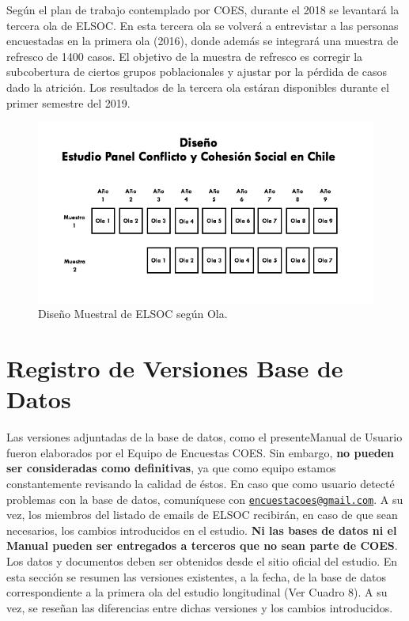 \documentclass[
]{book}
\begin{document}
Según el plan de trabajo contemplado por COES, durante el 2018 se levantará la tercera ola de ELSOC. En esta tercera ola se volverá a entrevistar a las personas encuestadas en la primera ola (2016), donde además se integrará una muestra de refresco de 1400 casos. El objetivo de la muestra de refresco es corregir la subcobertura de ciertos grupos poblacionales y ajustar por la pérdida de casos dado la atrición. Los resultados de la tercera ola estáran disponibles durante el primer semestre del 2019.

\begin{figure}

{\centering \includegraphics[width=0.85\linewidth,height=0.85\textheight]{imagenes/Sample_Design} 

}

\caption{Diseño Muestral de ELSOC según Ola.}\label{fig:unnamed-chunk-10}
\end{figure}

\hypertarget{registro-de-versiones-base-de-datos}{%
\chapter{Registro de Versiones Base de Datos}\label{registro-de-versiones-base-de-datos}}

Las versiones adjuntadas de la base de datos, como el presenteManual de Usuario fueron elaborados por el Equipo de Encuestas COES. Sin embargo, \textbf{no pueden ser consideradas como definitivas}, ya que como equipo estamos constantemente revisando la calidad de éstos. En caso que como usuario detecté problemas con la base de datos, comuníquese con \href{mailto:encuestacoes@gmail.com}{\nolinkurl{encuestacoes@gmail.com}}. A su vez, los miembros del listado de emails de ELSOC recibirán, en caso de que sean necesarios, los cambios introducidos en el estudio. \textbf{Ni las bases de datos ni el Manual pueden ser entregados a terceros que no sean parte de COES}. Los datos y documentos deben ser obtenidos desde el sitio oficial del estudio. En esta sección se resumen las versiones existentes, a la fecha, de la base de datos correspondiente a la primera ola del estudio longitudinal (Ver Cuadro 8). A su vez, se reseñan las diferencias entre dichas versiones y los cambios introducidos.
\end{document}
